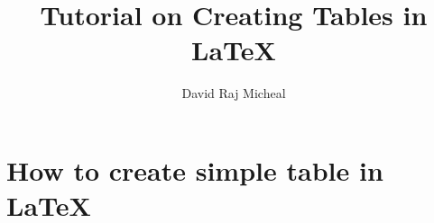 \documentclass{article}
\title{Tutorial on Creating Tables in \LaTeX}
\author{David Raj Micheal}
\begin{document}
\maketitle

\section{How to create simple table in \LaTeX}
\end{document}
